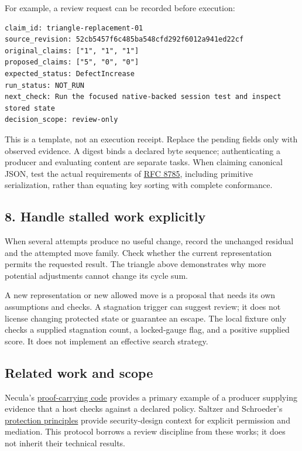 \documentclass[
  11pt,
]{article}
\begin{document}
For example, a review request can be recorded before execution:

\begin{lstlisting}
claim_id: triangle-replacement-01
source_revision: 52cb5457f6c485ba548cfd292f6012a941ed22cf
original_claims: ["1", "1", "1"]
proposed_claims: ["5", "0", "0"]
expected_status: DefectIncrease
run_status: NOT_RUN
next_check: Run the focused native-backed session test and inspect stored state
decision_scope: review-only
\end{lstlisting}

This is a template, not an execution receipt. Replace the pending fields
only with observed evidence. A digest binds a declared byte sequence;
authenticating a producer and evaluating content are separate tasks.
When claiming canonical JSON, test the actual requirements of
\href{https://www.rfc-editor.org/rfc/rfc8785}{RFC 8785}, including
primitive serialization, rather than equating key sorting with complete
conformance.

\subsection{8. Handle stalled work
explicitly}\label{handle-stalled-work-explicitly}

When several attempts produce no useful change, record the unchanged
residual and the attempted move family. Check whether the current
representation permits the requested result. The triangle above
demonstrates why more potential adjustments cannot change its cycle sum.

A new representation or new allowed move is a proposal that needs its
own assumptions and checks. A stagnation trigger can suggest review; it
does not license changing protected state or guarantee an escape. The
local fixture only checks a supplied stagnation count, a locked-gauge
flag, and a positive supplied score. It does not implement an effective
search strategy.

\subsection{Related work and scope}\label{related-work-and-scope}

Necula's \href{https://doi.org/10.1145/263699.263712}{proof-carrying
code} provides a primary example of a producer supplying evidence that a
host checks against a declared policy. Saltzer and Schroeder's
\href{https://doi.org/10.1109/PROC.1975.9939}{protection principles}
provide security-design context for explicit permission and mediation.
This protocol borrows a review discipline from these works; it does not
inherit their technical results.
\end{document}
